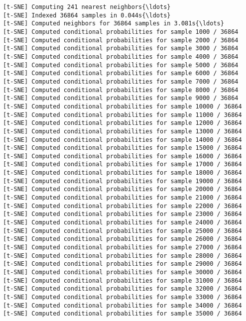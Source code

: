 \documentclass[11pt]{article}
\begin{document}
    \begin{Verbatim}[commandchars=\\\{\}]
[t-SNE] Computing 241 nearest neighbors{\ldots}
[t-SNE] Indexed 36864 samples in 0.044s{\ldots}
[t-SNE] Computed neighbors for 36864 samples in 3.081s{\ldots}
[t-SNE] Computed conditional probabilities for sample 1000 / 36864
[t-SNE] Computed conditional probabilities for sample 2000 / 36864
[t-SNE] Computed conditional probabilities for sample 3000 / 36864
[t-SNE] Computed conditional probabilities for sample 4000 / 36864
[t-SNE] Computed conditional probabilities for sample 5000 / 36864
[t-SNE] Computed conditional probabilities for sample 6000 / 36864
[t-SNE] Computed conditional probabilities for sample 7000 / 36864
[t-SNE] Computed conditional probabilities for sample 8000 / 36864
[t-SNE] Computed conditional probabilities for sample 9000 / 36864
[t-SNE] Computed conditional probabilities for sample 10000 / 36864
[t-SNE] Computed conditional probabilities for sample 11000 / 36864
[t-SNE] Computed conditional probabilities for sample 12000 / 36864
[t-SNE] Computed conditional probabilities for sample 13000 / 36864
[t-SNE] Computed conditional probabilities for sample 14000 / 36864
[t-SNE] Computed conditional probabilities for sample 15000 / 36864
[t-SNE] Computed conditional probabilities for sample 16000 / 36864
[t-SNE] Computed conditional probabilities for sample 17000 / 36864
[t-SNE] Computed conditional probabilities for sample 18000 / 36864
[t-SNE] Computed conditional probabilities for sample 19000 / 36864
[t-SNE] Computed conditional probabilities for sample 20000 / 36864
[t-SNE] Computed conditional probabilities for sample 21000 / 36864
[t-SNE] Computed conditional probabilities for sample 22000 / 36864
[t-SNE] Computed conditional probabilities for sample 23000 / 36864
[t-SNE] Computed conditional probabilities for sample 24000 / 36864
[t-SNE] Computed conditional probabilities for sample 25000 / 36864
[t-SNE] Computed conditional probabilities for sample 26000 / 36864
[t-SNE] Computed conditional probabilities for sample 27000 / 36864
[t-SNE] Computed conditional probabilities for sample 28000 / 36864
[t-SNE] Computed conditional probabilities for sample 29000 / 36864
[t-SNE] Computed conditional probabilities for sample 30000 / 36864
[t-SNE] Computed conditional probabilities for sample 31000 / 36864
[t-SNE] Computed conditional probabilities for sample 32000 / 36864
[t-SNE] Computed conditional probabilities for sample 33000 / 36864
[t-SNE] Computed conditional probabilities for sample 34000 / 36864
[t-SNE] Computed conditional probabilities for sample 35000 / 36864

\end{Verbatim}
\end{document}
